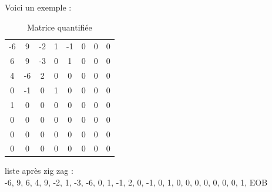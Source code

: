 \documentclass{article}
\begin{document}
\begin{minipage}{0.65\textwidth}

    \vspace{.3cm}
    \begin{center}
        Voici un exemple :
    \end{center}
    \vspace{-.3cm}

    \hfill
    \begin{minipage}{0.45\textwidth}
        \centering
        \begin{table}[H]
            \centering
            \setlength{\tabcolsep}{3pt} %
            \renewcommand{\arraystretch}{1.2} %
            \begin{tabular}{cccccccc}
                -6 & 9 & -2 & 1 & -1 & 0 & 0 & 0 \\
                6 & 9 & -3 & 0 & 1 & 0 & 0 & 0 \\
                4 & -6 & 2 & 0 & 0 & 0 & 0 & 0 \\
                0 & -1 & 0 & 1 & 0 & 0 & 0 & 0 \\
                1 & 0 & 0 & 0 & 0 & 0 & 0 & 0 \\
                0 & 0 & 0 & 0 & 0 & 0 & 0 & 0 \\
                0 & 0 & 0 & 0 & 0 & 0 & 0 & 0 \\
                0 & 0 & 0 & 0 & 0 & 0 & 0 & 0 \\
            \end{tabular}
            \caption*{\centering Matrice quantifiée}
        \end{table}
    \end{minipage}
    \hfill
    \begin{minipage}{0.53\textwidth}
        \centering
        liste après zig zag : \\ -6, 9, 6, 4, 9, -2, 1, -3, -6, 0, 1, -1, 2, 0, -1, 0, 1, 0, 0, 0, 0, 0, 0, 0, 1, EOB
    \end{minipage}
    \hfill
\end{minipage}

\vspace{1cm}
\end{document}
